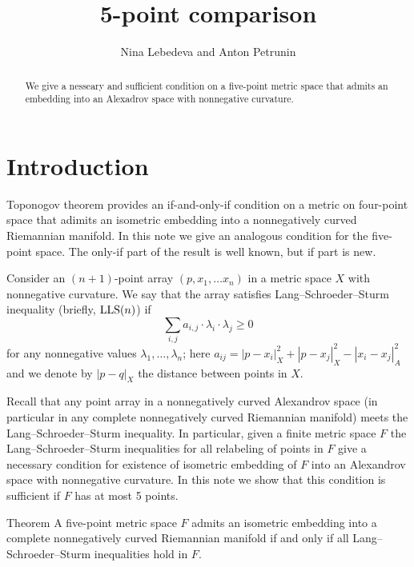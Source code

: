 \documentclass{article}
\begin{document}


\title{5-point comparison}
\author{Nina Lebedeva and Anton Petrunin}

\date{}
\maketitle
\begin{abstract}
We give a nesseary and sufficient condition on a five-point metric space that admits an embedding into an Alexadrov space with nonnegative curvature.
\end{abstract}


\section{Introduction}

Toponogov theorem provides an if-and-only-if condition on a metric on four-point space that adimits an isometric embedding into a nonnegatively curved Riemannian manifold.
In this note we give an analogous condition for the five-point space.
The only-if part of the result is well known, but if part is new.

Consider an $(n+1)$-point array $(p,x_1,\dots x_n)$ in a metric space $X$ with nonnegative curvature.
We say that the array satisfies Lang--Schroeder--Sturm inequality (briefly,  $\mathrm{LLS}(n)$)
if 
\[\sum_{i,j}a_{i,j}\cdot \lambda_i\cdot\lambda_j\ge 0\]
for any nonnegative values $\lambda_1,\dots,\lambda_n$;
here $a_{ij}=|p-x_i|_X^2+|p-x_j|_X^2-|x_i-x_j|_A^2$
and we denote by $|p-q|_X$ the distance between points in $X$.

Recall that any point array in a nonnegatively curved Alexandrov space (in particular in any complete nonnegatively curved Riemannian manifold) meets the Lang--Schroeder--Sturm inequality.
In particular, 
given a finite metric space $F$ the
Lang--Schroeder--Sturm inequalities for all relabeling of points in $F$
give a necessary condition for existence of isometric embedding of $F$ into an Alexandrov space with nonnegative curvature.
In this note we show that this condition is sufficient if $F$ has at most 5 points.

\begin{thm}{Theorem}\label{thm:main}
A five-point metric space $F$ admits an isometric embedding into a complete nonnegatively curved Riemannian manifold
if and only if all Lang--Schroeder--Sturm inequalities hold in $F$.
\end{thm}
\end{document}
